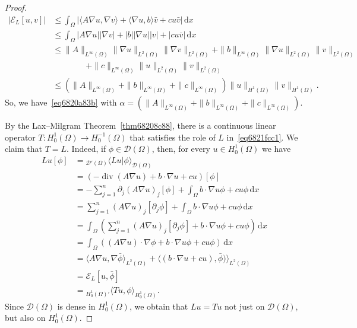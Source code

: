 \documentclass[a4paper,9pt]{amsart}
\newcommand{\scr}[1]{\mathscr{#1}}
\newcommand{\did}{\,\mathrm{d}}	%
\newcommand{\de}{\partial}		%
\renewcommand{\div}{\operatorname{div}}	%
\newcommand{\grad}{\nabla}
\theoremstyle{plain}
\theoremstyle{definition}
\theoremstyle{remark}
\begin{document}
\begin{proof}
	\begin{align}
		|\scr E_L[u,v]|
		&\le \int_\Omega \left| \langle A\grad u,\grad v \rangle + \langle \grad u,b \rangle \bar v + c u \bar v \right| \did x \\
		&\le \int_\Omega  |A\grad u| |\grad v| 
			+ |b| |\grad u| |v| + |c u \bar v| \did x \\
		&\le \|A\|_{L^\infty(\Omega)} \|\grad u\|_{L^2(\Omega)} \|\grad v\|_{L^2(\Omega)} 
			+ \|b\|_{L^\infty(\Omega)} \|\grad u\|_{L^2(\Omega)} \| v\|_{L^2(\Omega)} \\
		&\qquad\qquad
			+ \|c\|_{L^\infty(\Omega)} \|u\|_{L^2(\Omega)} \| v\|_{L^2(\Omega)} \\
		&\le (\|A\|_{L^\infty(\Omega)} + \|b\|_{L^\infty(\Omega)} + \|c\|_{L^\infty(\Omega)} ) \|u\|_{H^1(\Omega)} \|v\|_{H^1(\Omega)} .
	\end{align}
	So, we have~\eqref{eq6820a83b} with $\alpha=(\|A\|_{L^\infty(\Omega)} + \|b\|_{L^\infty(\Omega)} + \|c\|_{L^\infty(\Omega)} )$.
	
	By the Lax--Milgram Theorem~\ref{thm68208c88}, there is a continuous linear operator $T:H^1_0(\Omega)\to H^{-1}_0(\Omega)$ that satisfies the role of $L$ in~\eqref{eq6821fcc1}.
	We claim that $T=L$.
	Indeed, if $\phi\in\scr D(\Omega)$, then, for every $u\in H^1_0(\Omega)$ we have
	\begin{align}
		Lu[\phi] &= {}_{\scr D'(\Omega)}\langle Lu|\phi \rangle_{\scr D(\Omega)} \\
		&= (-\div(A\grad u) + b\cdot \grad u + c u )[\phi] \\
		&= - \sum_{j=1}^n \de_j(A\grad u)_j[\phi] + \int_\Omega b\cdot\grad u \phi + c u\phi \did x \\
		&= \sum_{j=1}^n (A\grad u)_j[\de_j\phi] + \int_\Omega b\cdot\grad u \phi + c u\phi \did x \\
		&= \int_\Omega ( \sum_{j=1}^n (A\grad u)_j[\de_j\phi] +  b\cdot\grad u \phi + c u\phi ) \did x \\
		&= \int_\Omega ( (A\grad u)\cdot\grad\phi +  b\cdot\grad u \phi + c u\phi ) \did x \\
		&= \langle A\grad u , \grad\bar\phi \rangle_{L^2(\Omega)} 
			+ \langle  (b\cdot\grad u + c u) , \bar \phi ) \rangle_{L^2(\Omega)} \\
		&= \scr E_L[u,\bar \phi]\\
		&= {}_{H^1_0(\Omega)'}\langle Tu,\phi \rangle_{H^1_0(\Omega)} .
	\end{align}
	Since $\scr D(\Omega)$ is dense in $H^1_0(\Omega)$, we obtain that $Lu = Tu$ not just on $\scr D(\Omega)$, but also on $H^1_0(\Omega)$.
\end{proof}
\end{document}
